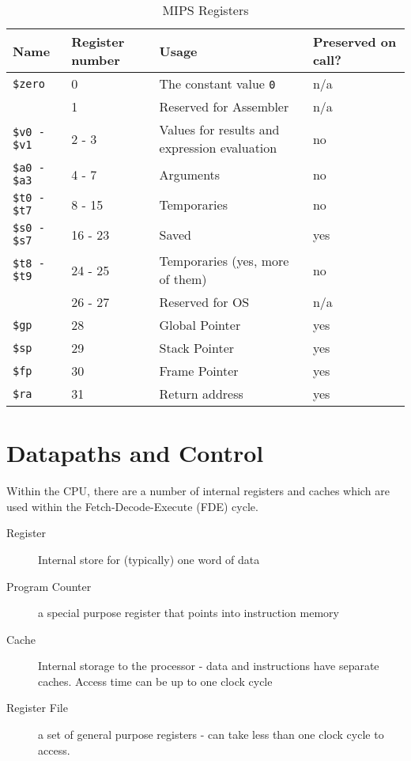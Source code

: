 \begin{table}[H]
    \centering
    {\RaggedRight
    \begin{tabular}{p{}p{}p{}p{}}
    \textbf{Name} & \textbf{Register number} & \textbf{Usage} & \textbf{Preserved on call?}\\
    \hline
    \hline
    \verb|$zero| & 0 & The constant value \verb|0| & n/a \\
    \hline
     & 1 & Reserved for Assembler & n/a \\
    \hline
    \verb|$v0 - $v1| & 2 - 3 & Values for results and expression evaluation & no\\
    \hline
    \verb|$a0 - $a3| & 4 - 7 & Arguments & no\\
    \hline
    \verb|$t0 - $t7| & 8 - 15 & Temporaries & no\\
    \hline
    \verb|$s0 - $s7| & 16 - 23 & Saved & yes\\
    \hline
    \verb|$t8 - $t9| & 24 - 25 & Temporaries (yes, more of them) & no\\
    \hline
     & 26 - 27 & Reserved for OS & n/a\\
    \hline
    \verb|$gp| & 28 & Global Pointer & yes\\
    \hline
    \verb|$sp| & 29 & Stack Pointer & yes\\
    \hline
    \verb|$fp| & 30 & Frame Pointer & yes\\
    \hline
    \verb|$ra| & 31 & Return address & yes\\
    \hline
    \end{tabular}
    } %
    \caption{MIPS Registers}
\end{table}

\section{Datapaths and Control}
Within the CPU, there are a number of internal registers and caches which are used within the Fetch-Decode-Execute (FDE) cycle.
\begin{description}
    \item[Register] Internal store for (typically) one word of data
    \item[Program Counter] a special purpose register that points into instruction memory
    \item[Cache] Internal storage to the processor - data and instructions have separate caches. Access time can be up to one clock cycle
    \item[Register File] a set of general purpose registers - can take less than one clock cycle to access. 
\end{description}

